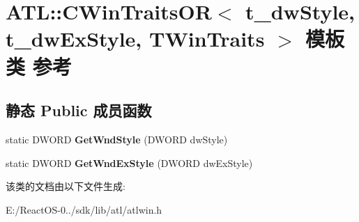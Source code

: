 \hypertarget{class_a_t_l_1_1_c_win_traits_o_r}{}\section{A\+TL\+:\+:C\+Win\+Traits\+OR$<$ t\+\_\+dw\+Style, t\+\_\+dw\+Ex\+Style, T\+Win\+Traits $>$ 模板类 参考}
\label{class_a_t_l_1_1_c_win_traits_o_r}
\subsection*{静态 Public 成员函数}
\begin{DoxyCompactItemize}
\item 
\mbox{\label{class_a_t_l_1_1_c_win_traits_o_r_ac065a6b9a170cb2433b6643027915df4}} 
static D\+W\+O\+RD {\bfseries Get\+Wnd\+Style} (D\+W\+O\+RD dw\+Style)
\item 
\mbox{\label{class_a_t_l_1_1_c_win_traits_o_r_a4edbede4973767dd3b7e433678f2c2f4}} 
static D\+W\+O\+RD {\bfseries Get\+Wnd\+Ex\+Style} (D\+W\+O\+RD dw\+Ex\+Style)
\end{DoxyCompactItemize}


该类的文档由以下文件生成\+:\begin{DoxyCompactItemize}
\item 
E\+:/\+React\+O\+S-\/0../sdk/lib/atl/atlwin.\+h\end{DoxyCompactItemize}
